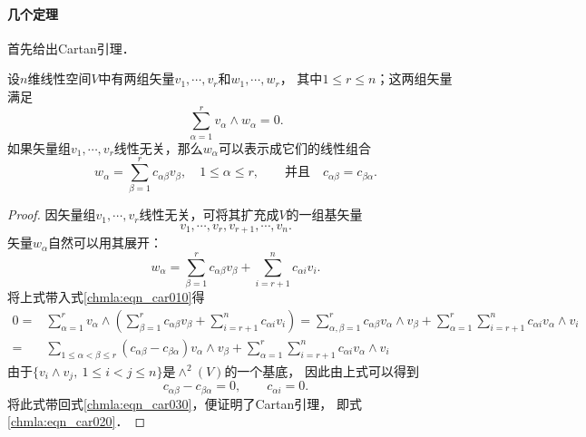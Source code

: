\paragraph{几个定理}

首先给出Cartan引理． 


\begin{theorem}\label{chmla:thm_cartanlemma}
设$n$维线性空间$V$中有两组矢量$v_1,\cdots,v_r$和$w_1,\cdots,w_r$，
其中$1 \leqslant r \leqslant n$；这两组矢量满足
\begin{equation} \label{chmla:eqn_car010}
    \sum_{\alpha=1}^{r} v_\alpha \wedge w_\alpha = 0.
\end{equation}
如果矢量组$v_1,\cdots,v_r$线性无关，那么$w_\alpha$可以表示成它们的线性组合
\begin{equation}\label{chmla:eqn_car020}
    w_\alpha = \sum_{\beta=1}^{r} c_{\alpha\beta} v_\beta, \quad
    1 \leqslant \alpha \leqslant r, \qquad
    {\text{并且}}\quad c_{\alpha\beta} = c_{\beta\alpha}  .
\end{equation}
\end{theorem}

\begin{proof}
因矢量组$v_1,\cdots,v_r$线性无关，可将其扩充成$V$的一组基矢量
\begin{equation*}
    v_1,\cdots,v_r, v_{r+1},\cdots,v_n .
\end{equation*}
矢量$w_\alpha$自然可以用其展开：
\begin{equation}\label{chmla:eqn_car030}
    w_\alpha = \sum_{\beta=1}^{r} c_{\alpha\beta} v_\beta
       + \sum_{i=r+1}^{n} c_{\alpha i} v_i .
\end{equation}
将上式带入式\eqref{chmla:eqn_car010}得
\begin{align*}
    0=& \sum_{\alpha=1}^{r} v_\alpha \wedge
      \left(\sum_{\beta=1}^{r} c_{\alpha\beta} v_\beta
      + \sum_{i=r+1}^{n} c_{\alpha i} v_i\right)
    = \sum_{\alpha,\beta=1}^{r} c_{\alpha\beta} v_\alpha \wedge v_\beta
      + \sum_{\alpha=1}^{r} \sum_{i=r+1}^{n} c_{\alpha i} v_\alpha \wedge  v_i \\
    =& \sum_{1\leqslant \alpha<\beta \leqslant r}^{} (c_{\alpha\beta}-c_{\beta\alpha} )
        v_\alpha \wedge v_\beta
    + \sum_{\alpha=1}^{r} \sum_{i=r+1}^{n} c_{\alpha i} v_\alpha \wedge  v_i
\end{align*}
由于$\{v_i \wedge v_j, \ 1\leqslant i<j \leqslant n\}$是$\wedge^2(V)$的一个基底，
因此由上式可以得到
\begin{equation}
    c_{\alpha\beta}-c_{\beta\alpha}=0, \qquad c_{\alpha i} =0.
\end{equation}
将此式带回式\eqref{chmla:eqn_car030}，便证明了Cartan引理，
即式\eqref{chmla:eqn_car020}．
\end{proof}


